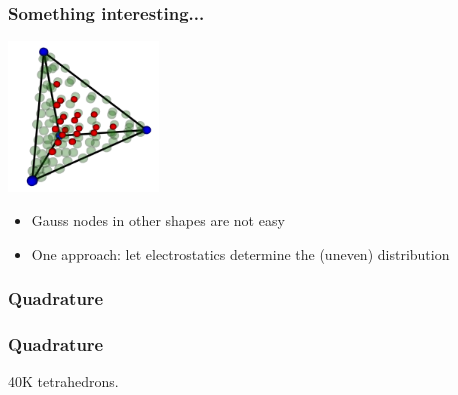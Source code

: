 \documentclass[10pt]{beamer}
\begin{document}
\begin{frame}
\frametitle{Something interesting...}
  \begin{center}
  \includegraphics[height=4cm]{./figs/tet}
  \end{center}
\begin{itemize}
  \item Gauss nodes in other shapes are not easy
  \item One approach: let electrostatics determine the (uneven) distribution
\end{itemize}
\end{frame}
\begin{frame}
\frametitle{Quadrature}
\begin{center}
\end{center}
\end{frame}
\begin{frame}
\frametitle{Quadrature}
\begin{center}
\end{center}
40K tetrahedrons.
\end{frame}
\end{document}
